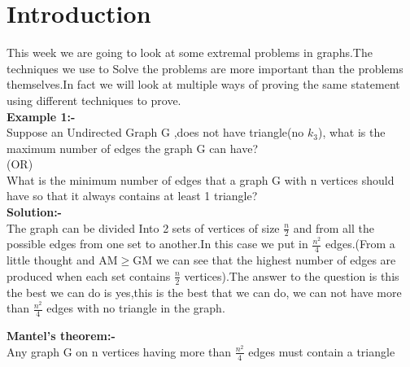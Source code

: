 \section{Introduction}
This week we are going to look at some extremal problems in graphs.The techniques we use to Solve the problems are more important than the problems themselves.In fact we will look at multiple ways of proving the same statement using different techniques to prove.\\
\textbf{Example 1:-}\\
Suppose an Undirected Graph G ,does not have triangle(no $k_3$), what is the maximum number of edges the graph G can have?\\
(OR)\\ 
What is the minimum number of edges that a graph G with n vertices should have so that it always contains at least 1 triangle?\\
\textbf{Solution:-}\\
The graph can be divided Into 2 sets of vertices of size $\frac{n}{2}$ and from all the possible edges from one set to another.In this case we put in $\frac{n^2}{4}$ edges.(From a little thought and AM$ \geq $GM we can see that the highest number of edges are produced when each set contains $\frac{n}{2}$ vertices).The answer to the question is this the best we can do is yes,this is the best that we can do, we can not have more than $\frac{n^2}{4}$ edges with no triangle in the graph.
\begin{theorem}
\textbf{Mantel's theorem:-}\\
Any graph G on n vertices having more than $\frac{n^2}{4}$ edges must contain a triangle
\end{theorem}
